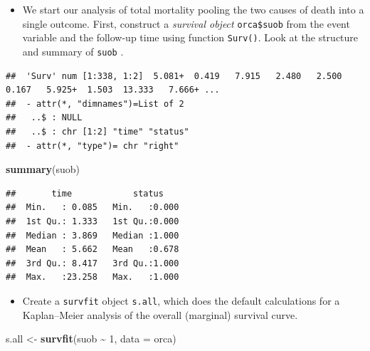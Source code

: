 \documentclass[
]{book}
\newenvironment{Shaded}{\begin{snugshade}}{\end{snugshade}}
\newcommand{\AttributeTok}[1]{\textcolor[rgb]{0.13,0.29,0.53}{#1}}
\newcommand{\DecValTok}[1]{\textcolor[rgb]{0.00,0.00,0.81}{#1}}
\newcommand{\FunctionTok}[1]{\textcolor[rgb]{0.13,0.29,0.53}{\textbf{#1}}}
\newcommand{\NormalTok}[1]{#1}
\newcommand{\OtherTok}[1]{\textcolor[rgb]{0.56,0.35,0.01}{#1}}
\newcommand{\SpecialCharTok}[1]{\textcolor[rgb]{0.81,0.36,0.00}{\textbf{#1}}}
\providecommand{\tightlist}{%
  \setlength{\itemsep}{0pt}\setlength{\parskip}{0pt}}
\theoremstyle{definition}
\theoremstyle{definition}
\theoremstyle{definition}
\theoremstyle{definition}
\theoremstyle{remark}
\begin{document}
\begin{itemize}
\tightlist
\item
  We start our analysis of total mortality pooling the two causes of
  death into a single outcome. First, construct a \emph{survival object}
  \texttt{orca\$suob} from the event variable and the follow-up time using
  function \texttt{Surv()}. Look at the structure and summary of \texttt{suob} .
\end{itemize}

\begin{Shaded}
\end{Shaded}

\begin{verbatim}
##  'Surv' num [1:338, 1:2]  5.081+  0.419   7.915   2.480   2.500   0.167   5.925+  1.503  13.333   7.666+ ...
##  - attr(*, "dimnames")=List of 2
##   ..$ : NULL
##   ..$ : chr [1:2] "time" "status"
##  - attr(*, "type")= chr "right"
\end{verbatim}

\begin{Shaded}
\begin{Highlighting}[]
\FunctionTok{summary}\NormalTok{(suob)}
\end{Highlighting}
\end{Shaded}

\begin{verbatim}
##       time            status     
##  Min.   : 0.085   Min.   :0.000  
##  1st Qu.: 1.333   1st Qu.:0.000  
##  Median : 3.869   Median :1.000  
##  Mean   : 5.662   Mean   :0.678  
##  3rd Qu.: 8.417   3rd Qu.:1.000  
##  Max.   :23.258   Max.   :1.000
\end{verbatim}

\begin{itemize}
\tightlist
\item
  Create a \texttt{survfit} object \texttt{s.all}, which does the default calculations
  for a Kaplan--Meier analysis of the overall (marginal) survival curve.
\end{itemize}

\begin{Shaded}
\begin{Highlighting}[]
\NormalTok{s.all }\OtherTok{\textless{}{-}} \FunctionTok{survfit}\NormalTok{(suob }\SpecialCharTok{\textasciitilde{}} \DecValTok{1}\NormalTok{, }\AttributeTok{data =}\NormalTok{ orca)}
\end{Highlighting}
\end{Shaded}
\end{document}
